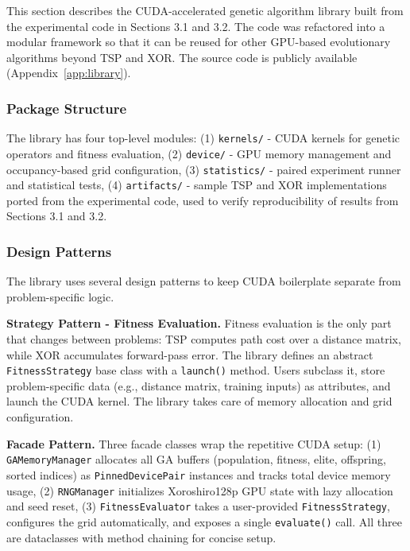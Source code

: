 \documentclass[a4paper,14pt]{extarticle}
\begin{document}
This section describes the CUDA-accelerated genetic algorithm library built from the experimental code in Sections 3.1 and 3.2. The code was refactored into a modular framework so that it can be reused for other GPU-based evolutionary algorithms beyond TSP and XOR. The source code is publicly available (Appendix~\ref{app:library}).

\subsubsection*{Package Structure} The library has four top-level modules:
(1) \texttt{kernels/} - CUDA kernels for genetic operators and fitness evaluation,
(2) \texttt{device/} - GPU memory management and occupancy-based grid configuration,
(3) \texttt{statistics/} - paired experiment runner and statistical tests,
(4) \texttt{artifacts/} - sample TSP and XOR implementations ported from the experimental code, used to verify reproducibility of results from Sections 3.1 and 3.2.

\subsubsection*{Design Patterns}

The library uses several design patterns to keep CUDA boilerplate separate from problem-specific logic.

\textbf{Strategy Pattern - Fitness Evaluation.}
Fitness evaluation is the only part that changes between problems: TSP computes path cost over a distance matrix, while XOR accumulates forward-pass error. The library defines an abstract \texttt{FitnessStrategy} base class with a \texttt{launch()} method. Users subclass it, store problem-specific data (e.g., distance matrix, training inputs) as attributes, and launch the CUDA kernel. The library takes care of memory allocation and grid configuration.

\textbf{Facade Pattern.}
Three facade classes wrap the repetitive CUDA setup:
(1) \texttt{GAMemoryManager} allocates all GA buffers (population, fitness, elite, offspring, sorted indices) as \texttt{PinnedDevicePair} instances and tracks total device memory usage,
(2) \texttt{RNGManager} initializes Xoroshiro128p GPU state with lazy allocation and seed reset,
(3) \texttt{Fitness\-Evaluator} takes a user-provided \texttt{Fitness\-Strategy}, configures the grid automatically, and exposes a single \texttt{evaluate()} call.
All three are dataclasses with method chaining for concise setup.
\end{document}
